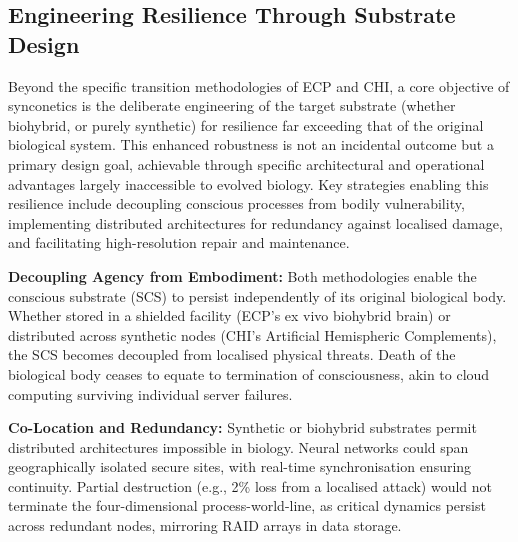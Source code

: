 \documentclass[10pt]{article}
\begin{document}
\begin{sloppypar}
  \subsection{Engineering Resilience Through Substrate Design}
  \label{sec:engineering-resilience}

  Beyond the specific transition methodologies of ECP and CHI, a core objective of synconetics is the deliberate engineering of the target substrate (whether biohybrid, or purely synthetic) for resilience far exceeding that of the original biological system. This enhanced robustness is not an incidental outcome but a primary design goal, achievable through specific architectural and operational advantages largely inaccessible to evolved biology. Key strategies enabling this resilience include decoupling conscious processes from bodily vulnerability, implementing distributed architectures for redundancy against localised damage, and facilitating high-resolution repair and maintenance.


  \textbf{Decoupling Agency from Embodiment:} Both methodologies enable the conscious substrate (SCS) to persist independently of its original biological body. Whether stored in a shielded facility (ECP’s ex vivo biohybrid brain) or distributed across synthetic nodes (CHI’s Artificial Hemispheric Complements), the SCS becomes decoupled from localised physical threats. Death of the biological body ceases to equate to termination of consciousness, akin to cloud computing surviving individual server failures.

  \textbf{Co-Location and Redundancy:} Synthetic or biohybrid substrates permit distributed architectures impossible in biology. Neural networks could span geographically isolated secure sites, with real-time synchronisation ensuring continuity. Partial destruction (e.g., 2\% loss from a localised attack) would not terminate the four-dimensional process-world-line, as critical dynamics persist across redundant nodes, mirroring RAID arrays in data storage.


\end{sloppypar}
\end{document}
